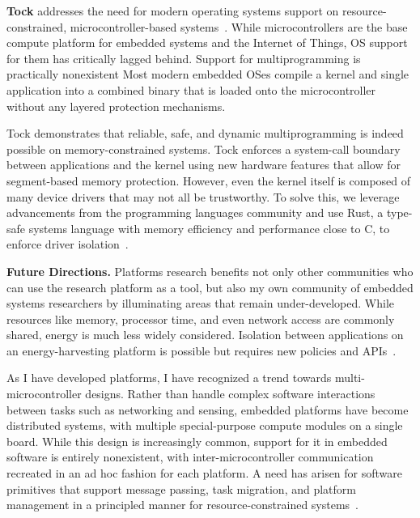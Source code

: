 \documentclass[11pt]{article} %
\begin{document}
\textbf{Tock} addresses the need for modern operating systems support on
resource-constrained, microcontroller-based systems~\cite{levy17multiprogramming}.
While microcontrollers are the base compute platform for
embedded systems and the Internet of Things, OS support for them has critically
lagged behind.
Support for multiprogramming is practically nonexistent Most modern embedded
OSes compile a kernel and single application into a combined binary that is
loaded onto the microcontroller without any layered protection mechanisms.

Tock demonstrates that reliable, safe, and dynamic multiprogramming is indeed
possible on memory-constrained systems. Tock enforces a system-call boundary between
applications and the kernel using new hardware features that allow for
segment-based memory protection. However, even the kernel itself is composed of
many device drivers that may not all be trustworthy. To solve this, we leverage
advancements from the programming languages community and use Rust, a type-safe
systems language with memory efficiency and performance close to C, to enforce
driver isolation~\cite{levy17rustkernel}.

\textbf{Future Directions.} Platforms research benefits not only other communities who
can use the research platform as a tool, but also my own community of embedded
systems researchers by illuminating areas that remain under-developed. While
resources like memory, processor time, and even network access are commonly
shared, energy is much less widely considered. Isolation between applications
on an energy-harvesting platform is possible but requires new policies and
APIs~\cite{adkins17energy}.

As I have developed platforms, I have recognized a trend towards
multi-microcontroller designs. Rather than handle complex software interactions
between tasks such as networking and sensing, embedded platforms have become
distributed systems, with multiple special-purpose compute modules on a single
board. While this design is increasingly common, support for it in embedded
software is entirely nonexistent, with inter-microcontroller communication
recreated in an ad hoc fashion for each platform. A need has arisen for
software primitives that support message passing, task migration, and platform
management in a principled manner for resource-constrained systems~\cite{ghena19distributed}.

\end{document}
